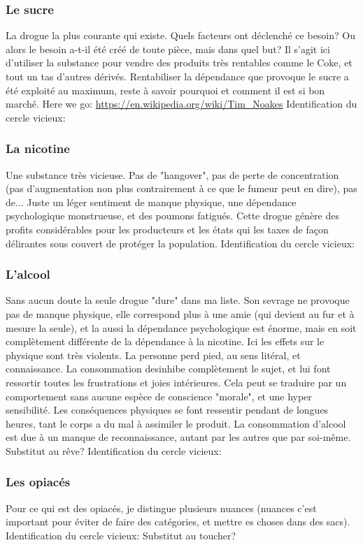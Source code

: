 \documentclass[11pt]{article} %
\begin{document}
\subsubsection{Le sucre}
La drogue la plus courante qui existe. Quels facteurs ont déclenché ce besoin? Ou alors le besoin a-t-il été créé de toute pièce, mais dans quel but?
Il s'agit ici d'utiliser la substance pour vendre des produits très rentables comme le Coke, et tout un tas d'autres dérivés.
Rentabiliser la dépendance que provoque le sucre a été exploité au maximum, reste à savoir pourquoi et comment il est si bon marché. 
Here we go: \url{https://en.wikipedia.org/wiki/Tim_Noakes}
Identification du cercle vicieux:
\subsubsection{La nicotine}
Une substance très vicieuse. Pas de "hangover", pas de perte de concentration (pas d'augmentation non plus contrairement à ce que le fumeur peut en dire),
pas de... Juste un léger sentiment de manque physique, une dépendance psychologique monstrueuse, et des poumons fatigués.
Cette drogue génère des profits considérables pour les producteurs et les états qui les taxes de façon délirantes sous couvert de protéger la population.
Identification du cercle vicieux:
\subsubsection{L'alcool}
Sans aucun doute la seule drogue "dure" dans ma liste. Son sevrage ne provoque pas de manque physique, elle correspond plus à une amie (qui devient au fur et à mesure la seule), et la aussi la dépendance psychologique est énorme, mais en soit complètement différente de la dépendance à la nicotine.
Ici les effets sur le physique sont très violents. La personne perd pied, au sens litéral, et connaissance. La consommation desinhibe complètement le sujet, et lui font ressortir toutes les frustrations et joies intérieures. Cela peut se traduire par un comportement sans aucune espèce de conscience "morale", et une hyper sensibilité.
Les conséquences physiques se font ressentir pendant de longues heures, tant le corps a du mal à assimiler le produit.
La consommation d'alcool est due à un manque de reconnaissance, autant par les autres que par soi-même.
Substitut au rêve?
Identification du cercle vicieux:
\subsubsection{Les opiacés}
Pour ce qui est des opiacés, je distingue plusieurs nuances (nuances c'est important pour éviter de faire des catégories, et mettre es choses dans des sacs).
Identification du cercle vicieux:
Substitut au toucher? 
\end{document}
